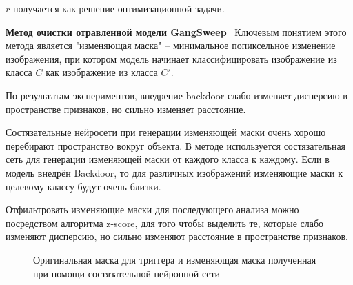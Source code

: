 $r$ получается как решение оптимизационной задачи.



\textbf{Метод очистки отравленной модели GangSweep}~\cite{zhu_gangsweep_2020}
Ключевым понятием этого метода является "изменяющая маска" – минимальное попиксельное изменение изображения, при котором модель начинает классифицировать изображение из класса $C$ как изображение из класса $C'$.

По результатам экспериментов, внедрение backdoor слабо изменяет дисперсию в пространстве признаков, но сильно изменяет расстояние.

Состязательные нейросети при генерации изменяющей маски очень хорошо перебирают
пространство вокруг объекта. В методе используется состязательная сеть
для генерации изменяющей маски от каждого класса к каждому.
Если в модель внедрён Backdoor, то для различных изображений изменяющие маски к целевому классу будут очень близки.

Отфильтровать изменяющие маски для последующего анализа можно посредством алгоритма z-score, для того чтобы выделить те, которые слабо изменяют дисперсию, но сильно изменяют расстояние в пространстве признаков.

\begin{figure}[h]
    \caption{Оригинальная маска для триггера и изменяющая маска полученная при помощи состязательной нейронной сети}
    \label{gangsweap_masks_examples}
\end{figure}